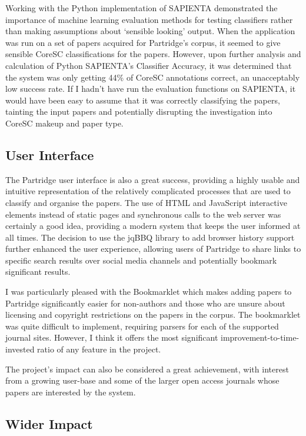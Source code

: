 Working with the Python implementation of SAPIENTA demonstrated the importance
of machine learning evaluation methods for testing classifiers rather than
making assumptions about `sensible looking' output. When the application was
run on a set of papers acquired for Partridge's corpus, it seemed to give
sensible CoreSC classifications for the papers. However, upon further analysis
and calculation of Python SAPIENTA's Classifier Accuracy, it was determined
that the system was only getting 44\% of CoreSC annotations correct, an
unacceptably low success rate. If I hadn't have run the evaluation functions on
SAPIENTA, it would have been easy to assume that it was correctly classifying
the papers, tainting the input papers and potentially disrupting the
investigation into CoreSC makeup and paper type.


\subsection{User Interface}
The Partridge user interface is also a great success, providing a highly usable
and intuitive representation of the relatively complicated processes that are
used to classify and organise the papers. The use of HTML and JavaScript
interactive elements instead of static pages and synchronous calls to the web
server was certainly a good idea, providing a modern system that keeps the user
informed at all times. The decision to use the jqBBQ library to add browser
history support further enhanced the user experience, allowing users of
Partridge to share links to specific search results over social media channels
and potentially bookmark significant results.

I was particularly pleased with the Bookmarklet which makes adding papers to
Partridge significantly easier for non-authors and those who are unsure about
licensing and copyright restrictions on the papers in the corpus. The
bookmarklet was quite difficult to implement, requiring parsers for each of the
supported journal sites. However, I think it offers the most significant
improvement-to-time-invested ratio of any feature in the project.

The project's impact can also be considered a great achievement, with interest
from a growing user-base and some of the larger open access journals whose
papers are interested by the system.

\subsection{Wider Impact}

